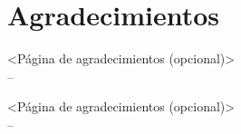 %
\section*{Agradecimientos}
\label{sec::agradecimientos}

\vspace*{\fill}

<Página de agradecimientos (opcional)>
\\ -- \thesisFirstAuthor

\vspace*{\fill}

<Página de agradecimientos (opcional)>
\\ -- \thesisSecondAuthor

\vspace*{\fill}



